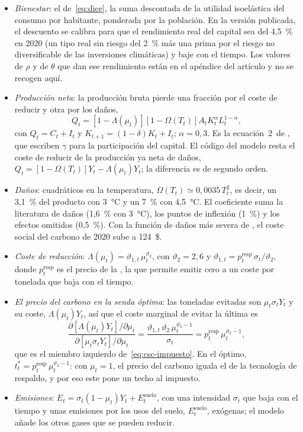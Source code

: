 \documentclass[11pt]{article}
\begin{document}
\begin{itemize}
\item \emph{Bienestar}: el de~\eqref{eq:dice}, la suma descontada de la utilidad isoelástica del consumo por habitante, ponderada por la población. En la versión publicada, el descuento se calibra para que el rendimiento real del capital sea del 4,5~\% en 2020 (un tipo real sin riesgo del 2~\% más una prima por el riesgo no diversificable de las inversiones climáticas) y baje con el tiempo\nocite{BarrageNordhaus2024DICE}. Los valores de $\rho$ y de $\theta$ que dan ese rendimiento están en el apéndice del artículo y no se recogen aquí.
\item \emph{Producción neta}: la producción bruta pierde una fracción por el coste de reducir y otra por los daños,
  \begin{equation}\label{eq:dice-produccion}
  Q_t=\left[1-\Lambda(\mu_t)\right]\left[1-\Omega(T_t)\right]A_tK_t^{\alpha}L_t^{1-\alpha},
  \end{equation}
  con $Q_t=C_t+I_t$ y $K_{t+1}=(1-\delta)K_t+I_t$; $\alpha=0{,}3$\nocite{BarrageNordhaus2023DICEwp}. Es la ecuación~2~de \textcite{BarrageNordhaus2024DICE}, que escriben $\gamma$ para la participación del capital. El código del modelo resta el coste de reducir de la producción ya neta de daños, $Q_t=[1-\Omega(T_t)]Y_t-\Lambda(\mu_t)Y_t$; la diferencia es de segundo orden.
\item \emph{Daños}: cuadráticos en la temperatura, $\Omega(T_t)\simeq0{,}0035\,T_t^2$, es decir, un 3,1~\% del producto con 3~°C y un 7~\% con 4,5~°C. El coeficiente suma la literatura de daños (1,6~\% con 3~°C), los puntos de inflexión (1~\%) y los efectos omitidos (0,5~\%)\nocite{BarrageNordhaus2024DICE}. Con la función de daños más severa de \textcite{HowardSterner2017Few}, el coste social del carbono de 2020 sube a 124~\$.
\item \emph{Coste de reducción}: $\Lambda(\mu_t)=\vartheta_{1,t}\,\mu_t^{\vartheta_2}$, con $\vartheta_2=2{,}6$ y $\vartheta_{1,t}=p^{\mathrm{resp}}_t\,\sigma_t/\vartheta_2$, donde $p^{\mathrm{resp}}_t$ es el precio de la , la que permite emitir cero a un coste por tonelada que baja con el tiempo\nocite{BarrageNordhaus2023DICEwp}.
\item \emph{El precio del carbono en la senda óptima}: las toneladas evitadas son $\mu_t\sigma_tY_t$ y su coste, $\Lambda(\mu_t)Y_t$, así que el coste marginal de evitar la última es
  \[
  \frac{\partial\left[\Lambda(\mu_t)Y_t\right]/\partial\mu_t}{\partial\left[\mu_t\sigma_tY_t\right]/\partial\mu_t}=\frac{\vartheta_{1,t}\,\vartheta_2\,\mu_t^{\vartheta_2-1}}{\sigma_t}=p^{\mathrm{resp}}_t\,\mu_t^{\vartheta_2-1},
  \]
  que es el miembro izquierdo de~\eqref{eq:csc-impuesto}. En el óptimo, $t^*_t=p^{\mathrm{resp}}_t\,\mu_t^{\vartheta_2-1}$: con $\mu_t=1$, el precio del carbono iguala el de la tecnología de respaldo, y por eso este pone un techo al impuesto.~\findemo
\item \emph{Emisiones}: $E_t=\sigma_t(1-\mu_t)Y_t+E^{\mathrm{suelo}}_t$, con una intensidad $\sigma_t$ que baja con el tiempo y unas emisiones por los usos del suelo, $E^{\mathrm{suelo}}_t$, exógenas; el modelo añade los otros gases que se pueden reducir.
\end{itemize}
\end{document}
